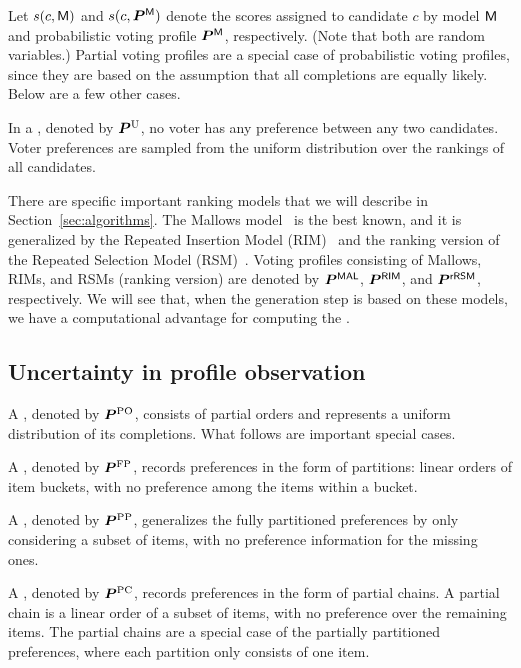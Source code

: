 Let $s(c, \mathsf{M})$ and $s(c, \bm{P}^{\mathsf{M}})$ denote the scores assigned to candidate $c$ by model $\mathsf{M}$ and  probabilistic voting profile $\bm{P}^{\mathsf{M}}$, respectively.
(Note that both are random variables.)
%
Partial voting profiles are a special case of probabilistic voting profiles, since they are based on the assumption that all completions are equally likely. 
Below are a few other cases.

In a , denoted by $\bm{P}^{\text{U}}$, no voter has any preference between any two candidates. Voter preferences are sampled from the uniform distribution over the rankings of all candidates.

There are specific important ranking models that we will describe in Section~\ref{sec:algorithms}.
The Mallows model~\cite{Mallows1957} is the best known, and it is generalized by the Repeated Insertion Model (RIM)~\cite{Doignon2004} and the ranking version of the Repeated Selection Model (RSM)~\cite{DBLP:journals/tdasci/ChakrabortyDKKR21}.
Voting profiles consisting of Mallows, RIMs, and RSMs (ranking version) are denoted by $\bm{P}^{\mathsf{MAL}}$, $\bm{P}^{\mathsf{RIM}}$, and $\bm{P}^{\mathsf{rRSM}}$, respectively.
We will see that, when the generation step is based on these models, we have a computational advantage for computing the \mew.

\subsection{Uncertainty in profile observation}

A , denoted by $\bm{P}^{\text{PO}}$, consists of partial orders and represents a uniform distribution of its completions.
What follows are important special cases.

A , denoted by $\bm{P}^{\text{FP}}$, records preferences in the form of partitions: linear orders of item buckets, with no preference among the items within a bucket.

A , denoted by $\bm{P}^{\text{PP}}$, generalizes the fully partitioned preferences by only considering a subset of items, with no preference information for the missing ones.

A , denoted by $\bm{P}^{\text{PC}}$, records preferences in the form of partial chains. A partial chain is a linear order of a subset of items, with no preference over the remaining items. The partial chains are a special case of the partially partitioned preferences, where each partition only consists of one item.

